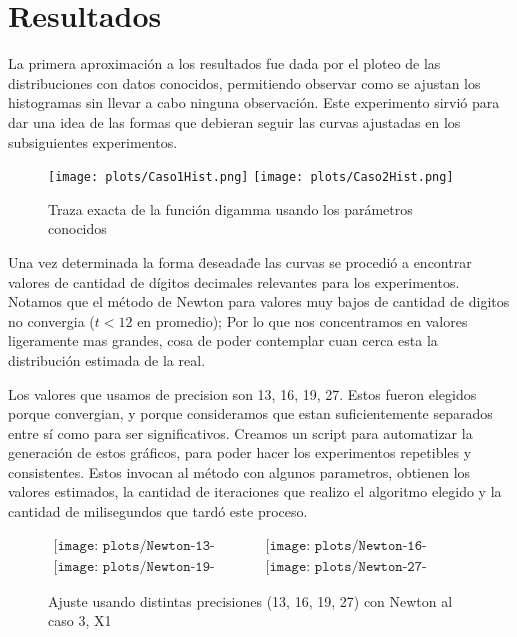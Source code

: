 \section{Resultados}


La primera aproximaci\'on a los resultados fue dada por el ploteo de las distribuciones con datos conocidos, permitiendo observar como se ajustan los histogramas sin llevar a cabo ninguna observaci\'on. Este experimento sirvi\'o para dar una idea de las formas que debieran seguir las curvas ajustadas en los subsiguientes experimentos.

\begin{figure} [H]
\begin {center}
\texttt{[image: plots/Caso1Hist.png]}
\texttt{[image: plots/Caso2Hist.png]}
\end {center}
\caption{Traza exacta de la funci\'on digamma usando los par\'ametros conocidos}
\label{fig:FitCaso3Newton}
\end{figure}

Una vez determinada la forma \"deseada\" de las curvas se procedi\'o a encontrar valores de cantidad de d\'igitos decimales relevantes para los experimentos. Notamos que el m\'etodo de Newton para valores muy bajos de cantidad de digitos no convergia ($t < 12$ en promedio); Por lo que nos concentramos en valores
ligeramente mas grandes, cosa de poder contemplar cuan cerca esta la distribuci\'on estimada de la real.

Los valores que usamos de precision son 13, 16, 19, 27. Estos fueron elegidos porque convergian, y porque consideramos que estan
suficientemente separados entre s\'i como para ser significativos. Creamos un script para automatizar la generaci\'on de estos gr\'aficos,
para poder hacer los experimentos repetibles y consistentes. Estos invocan al m\'etodo con algunos parametros, obtienen los
valores estimados, la cantidad de iteraciones que realizo el algoritmo elegido y la cantidad de milisegundos que tard\'o este proceso.


\begin{figure} [H]
$\begin{array}{cc}
\texttt{[image: plots/Newton-13-caso3.png]} &
\texttt{[image: plots/Newton-16-caso3.png]} \\
\texttt{[image: plots/Newton-19-caso3.png]} &
\texttt{[image: plots/Newton-27-caso3.png]}
\end{array}$
\caption{Ajuste usando distintas precisiones (13, 16, 19, 27) con Newton al caso 3, X1}
\label{fig:FitCaso3Newton}
\end{figure}

